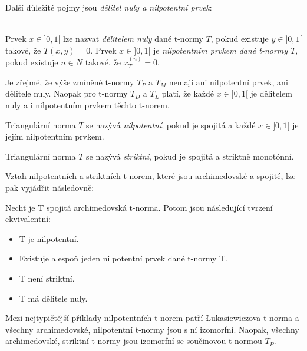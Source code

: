     Dal\v s\'i d\r uležité  pojmy jsou \textit{dělitel nuly a nilpotentn\'i prvek}:
    \begin{definition}
        \cite{KMP}\\
        Prvek $x \in ]0,1[$ lze nazvat {\em dělitelem nuly} dané t-normy $T$, pokud
        existuje $y \in ]0,1[$ takové, že $T(x,y) = 0.$
        Prvek $x \in ]0,1[$ je {\em nilpotentním prvkem dané t-normy $T$}, pokud existuje $n \in N$ takové,
        že $ x_T^{(n)} =0.$
    \end{definition}

    \begin{example}
        Je zřejmé, že výše zmíněné t-normy $T_P$ a $T_M$ nemají ani nilpotentní prvek, ani dělitele nuly. Naopak pro t-normy $T_D$ a $T_L$ platí, že každé $x \in ]0,1[$ je dělitelem nuly a i nilpotentním prvkem těchto t-norem.
    \end{example}

    \begin{definition}
    \cite{KMP}
        Triangul\'arn\'i norma $T$ se naz\'yv\'a {\em nilpotentní}, pokud je spojitá a každé $x
        \in ]0,1[$ je jejím nilpotentním prvkem.
    \end{definition}    
    \begin{definition}
    \cite{KMP}
        Triangul\'arn\'i norma $T$ se naz\'yv\'a {\em striktní}, pokud je
            spojitá a striktně monot\' onní.
    \end{definition} 
    
     Vztah nilpotentních a striktních t-norem, které jsou archimedovské a spojité, lze pak vyjádřit následovně:
    \begin{sentence}\cite{KMP}
        Nech\v t je T spojitá archimedovská t-norma. Potom jsou následující tvrzení ekvivalentní:
        \begin{itemize}
        \item T je nilpotentní.
        \item  Existuje alespo\v n jeden nilpotentní prvek dané t-normy T.
        \item T není striktní.
        \item  T má dělitele nuly.
        \end{itemize}
    \end{sentence}
    Mezi nejtypičtější příklady nilpotentních t-norem patří Łukasiewiczova t-norma a všechny archimedovsk\'e, nilpotentní t-normy jsou s ní izomorfní. Naopak, v\v sechny archimedovsk\'e, striktn\'i t-normy jsou izomorfn\'i se sou\v cinovou t-normou $T_P.$
    

